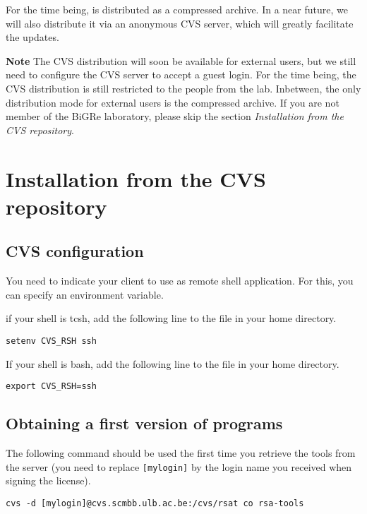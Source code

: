 \documentclass{book}
\begin{document}
For the time being, \RSAT is distributed as a compressed archive. In a
near future, we will also distribute it via an anonymous CVS server,
which will greatly facilitate the updates.

\textbf{Note} The CVS distribution will soon be available for external
users, but we still need to configure the CVS server to accept a guest
login. For the time being, the CVS distribution is still restricted to
the people from the lab. Inbetween, the only distribution mode for
external users is the compressed archive. If you are not member of the
BiGRe laboratory, please skip the section \textit{Installation from
  the CVS repository}.

\section{Installation from the CVS repository}


\subsection{CVS configuration}

You need to indicate your  client to use 
as remote shell application. For this, you can specify an environment
variable.

if your shell is tcsh, add the following line to the 
file in your home directory.

\begin{verbatim}
setenv CVS_RSH ssh
\end{verbatim}

If your shell is bash, add the following line to the 
file in your home directory.

\begin{verbatim}
export CVS_RSH=ssh
\end{verbatim}


\subsection{Obtaining a first version of \RSAT programs}

The following command should be used the first time you retrieve the
tools from the server (you need to replace \texttt{[mylogin]} by the
login name you received when signing the \RSAT license).

\begin{verbatim}
cvs -d [mylogin]@cvs.scmbb.ulb.ac.be:/cvs/rsat co rsa-tools
\end{verbatim}
\end{document}
